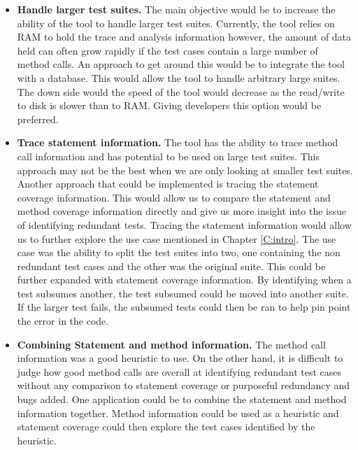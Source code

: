 \begin{itemize}

\item \textbf{Handle larger test suites.} The main objective would be to increase the ability of the tool to handle larger test suites. Currently, the tool relies on RAM to hold the trace and analysis information however, the amount of data held can often grow rapidly if the test cases contain a large number of method calls. An approach to get around this would be to integrate the tool with a database. This would allow the tool to handle arbitrary large suites. The down side would the speed of the tool would decrease as the read/write to disk is slower than to RAM. Giving developers this option would be preferred. 

\item \textbf{Trace statement information.} The tool has the ability to trace method call information and has potential to be used on large test suites. This approach may not be the best when we are only looking at smaller test suites. Another approach that could be implemented is tracing the statement coverage information. This would allow us to compare the statement and method coverage information directly and give us more insight into the issue of identifying redundant tests. Tracing the statement information would allow us to further explore the use case mentioned in Chapter \ref{C:intro}. The use case was the ability to split the test suites into two, one containing the non redundant test cases and the other was the original suite. This could be further expanded with statement coverage information. By identifying when a test subsumes another, the test subsumed could be moved into another suite. If the larger test fails, the subsumed tests could then be ran to help pin point the error in the code.

\item \textbf{Combining Statement and method information.} The method call information was a good heuristic to use. On the other hand, it is difficult to judge how good method calls are overall at identifying redundant test cases without any comparison to statement coverage or purposeful redundancy and bugs added. One application could be to combine the statement and method information together. Method information could be used as a heuristic and statement coverage could then explore the test cases identified by the heuristic.

\end{itemize}


